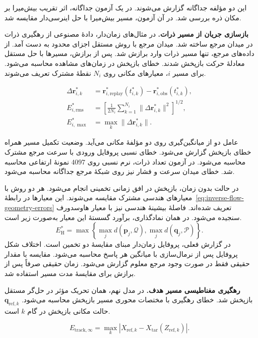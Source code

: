 این دو مؤلفه جداگانه گزارش می‌شوند.
در یک آزمون جداگانه، اثر تقریب بیش‌میرا بر مکان ذره بررسی شد.
در آن آزمون، مسیر بیش‌میرا با حل اینرسی‌دار  مقایسه شد.

\textbf{بازسازی جریان از مسیر ذرات.}
در مثال‌های زمان‌دار، دادهٔ مصنوعی از رهگیری ذرات در میدان مرجع ساخته شد.
میدان مرجع با روش مستقل اجزای محدود به دست آمد.
از داده‌های مرجع، تنها مسیر ذرات وارد برازش شد.
پس از برازش، مسیرها با حل مستقل معادلهٔ حرکت بازپخش شدند.
خطای بازپخش در زمان‌های مشاهده محاسبه می‌شود.
برای مسیر $i$، معیارهای مکانی روی $N_i$ نقطهٔ مشترک تعریف می‌شوند.

\begin{equation}
\begin{aligned}
\Delta\mathbf r_{i,k}^*
&=\mathbf r_{i,\mathrm{replay}}^*(t_{i,k}^*)
 -\mathbf r_{i,\mathrm{obs}}^*(t_{i,k}^*),\\
E_{i,\mathrm{rms}}^*
&=\left[\frac1{2N_i}\sum_{k=1}^{N_i}
 \|\Delta\mathbf r_{i,k}^*\|^2\right]^{1/2},\\
E_{i,\max}^*&=\max_k\|\Delta\mathbf r_{i,k}^*\|.
\end{aligned}
\label{eq:validation-inverse-timed-path}
\end{equation}

عامل دو از میانگین‌گیری روی دو مؤلفهٔ مکانی می‌آید.
وضعیت تکمیل مسیر همراه خطای بازپخش گزارش می‌شود.
خطای نسبی پروفایل ورودی با سرعت مرجع مشترک محاسبه می‌شود.
در آزمون تعداد ذرات، نرم نسبی روی $4097$ نمونهٔ ارتفاعی محاسبه شد.
خطای میدان سرعت و فشار نیز روی شبکهٔ مرجع جداگانه محاسبه می‌شود.

در حالت بدون زمان، بازپخش در افق زمانی تخمینی انجام می‌شود.
هر دو روش با معیارهای هندسی مشترک مقایسه می‌شوند.
این معیارها در رابطهٔ~\eqref{eq:inverse-flow-geometry-errors} تعریف شده‌اند.
فاصلهٔ بیشینهٔ هندسی نیز با معیار هاوسدورف سنجیده می‌شود.
در همان نمادگذاری، برآورد گسستهٔ این معیار به‌صورت زیر است.
\[
E_{\mathrm H}^*=
\max\!\left\{
\max_j d(\mathbf p_j,\mathcal Q),
\max_j d(\mathbf q_j,\mathcal P)
\right\}.
\]
در گزارش فعلی، پروفایل زمان‌دار مبنای مقایسهٔ دو تخمین است.
اختلاف شکل پروفایل پس از نرمال‌سازی با میانگین هر پاسخ محاسبه می‌شود.
مقایسه با مقدار حقیقی فقط در صورت وجود مرجع معلوم گزارش می‌شود.
زمان حقیقی صرفاً پس از برازش برای مقایسهٔ مدت مسیر استفاده شد.

\textbf{رهگیری مغناطیسی مسیر هدف.}
در مدل نهم، همان تحریک مؤثر در حل‌گر مستقل  بازپخش شد.
خطای رهگیری با مختصات محوری مسیر بازپخش محاسبه می‌شود.
$\mathbf q_{\mathrm{ref},k}$ حالت مکانی بازپخش در گام $k$ است.

\begin{equation}
E_{\mathrm{track},\infty}
=\max_k
 |X_{\mathrm{ref},k}-X_{\mathrm{tar}}(Z_{\mathrm{ref},k})|.
\label{eq:validation-master9-tracking}
\end{equation}

